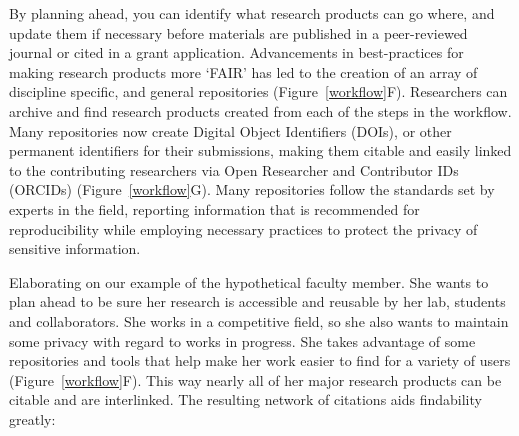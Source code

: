 \documentclass[10pt,letterpaper]{article}
\begin{document}
By planning ahead, you can identify what research products can go where, and
update them if necessary before materials are published in a peer-reviewed
journal or cited in a grant application. Advancements in best-practices
for making research products more `FAIR' has led to the creation of an array
of discipline specific, and general repositories\cite{PLOS2020} (Figure~\ref{workflow}F). 
Researchers can archive and find research products created from each of the steps in the workflow.
Many repositories now create Digital Object Identifiers (DOIs)\cite{DOI2020}, or
other permanent identifiers for their submissions, making them citable and
easily linked to the contributing researchers via Open Researcher and Contributor
IDs (ORCIDs)\cite{ORCID2020} (Figure~\ref{workflow}G). Many repositories follow the standards
set by experts in the field, reporting information that is recommended for
reproducibility while employing necessary practices to protect the privacy of
sensitive information.

Elaborating on our example of the hypothetical faculty member. She wants to plan 
ahead to be sure her research is accessible and reusable by her lab, students and 
collaborators. She works in a competitive field, so she also wants to maintain 
some privacy with regard to works in progress. She takes advantage of some
repositories and tools that help make her work easier to find for a variety of
users (Figure~\ref{workflow}F). This way nearly all of her major research products can be citable and
are interlinked. The resulting network of citations aids findability greatly:
\end{document}
